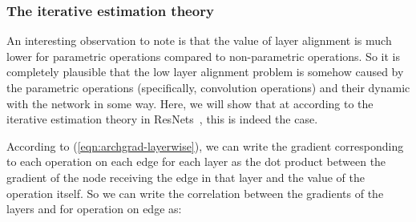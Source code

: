 \documentclass{article} \usepackage{fancyhdr, iclr2023_conference, times}
\newcommand{\lambdafn}{layer alignment\xspace}
\begin{document}
\subsubsection{The iterative estimation theory}
\par An interesting observation to note is that the value of \lambdafn is much lower for parametric operations compared to non-parametric operations. So it is completely plausible that the low \lambdafn problem is somehow caused by the parametric operations (specifically, convolution operations) and their dynamic with the network in some way. Here, we will show that at according to the iterative estimation theory in ResNets~\citep{DBLP:conf/iclr/GreffSS17}, this is indeed the case.
\par According to (\ref{eqn:archgrad-layerwise}), we can write the gradient corresponding to each operation on each edge for each layer as the dot product between the gradient of the node receiving the edge in that layer and the value of the operation itself. So we can write the correlation between the gradients of the layers  and  for operation  on edge  as:
\end{document}

